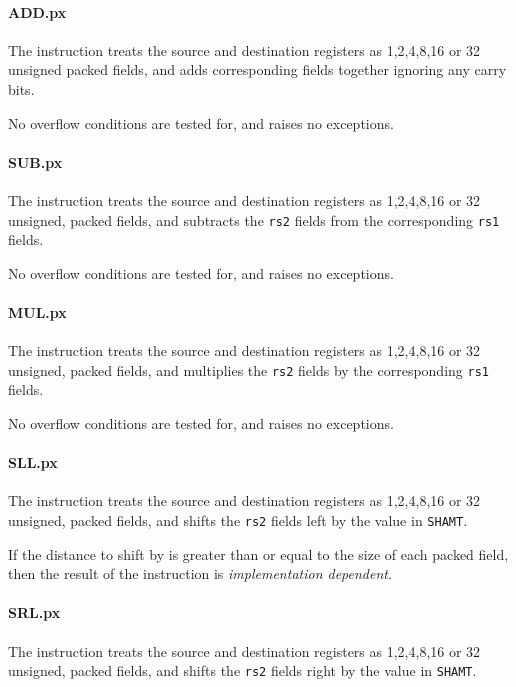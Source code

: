\paragraph{ADD.px}

The instruction  treats the source and destination registers as
1,2,4,8,16 or 32 unsigned packed fields, and adds corresponding fields
together ignoring any carry bits.

No overflow conditions are tested for, and  raises no exceptions.

\paragraph{SUB.px}

The instruction  treats the source and destination registers as
1,2,4,8,16 or 32 unsigned, packed fields, and subtracts the {\tt rs2} fields
from the corresponding {\tt rs1} fields.

No overflow conditions are tested for, and  raises no exceptions.

\paragraph{MUL.px}

The instruction  treats the source and destination registers as
1,2,4,8,16 or 32 unsigned, packed fields, and multiplies the {\tt rs2} fields
by the corresponding {\tt rs1} fields.

No overflow conditions are tested for, and  raises no exceptions.

\paragraph{SLL.px}

The instruction  treats the source and destination registers as
1,2,4,8,16 or 32 unsigned, packed fields, and shifts the {\tt rs2} fields
left by the value in {\tt SHAMT}.

If the distance to shift by is greater than or equal to the size of each
packed field, then the result of the  instruction is
{\em implementation dependent}.

\paragraph{SRL.px}

The instruction  treats the source and destination registers as
1,2,4,8,16 or 32 unsigned, packed fields, and shifts the {\tt rs2} fields
right by the value in {\tt SHAMT}.

